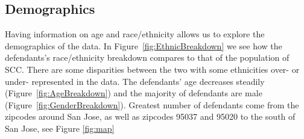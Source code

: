 \subsection{Demographics}
Having information on age and race/ethnicity allows us to explore the demographics of the data. In Figure~\ref{fig:EthnicBreakdown} we see how the defendants's race/ethnicity breakdown compares to that of the population of SCC. There are some disparities between the two with some ethnicities over- or under- represented in the data. The defendants' age decreases steadily (Figure~\ref{fig:AgeBreakdown}) and the majority of defendants are male (Figure~\ref{fig:GenderBreakdown}). Greatest number of defendants come from the zipcodes around San Jose, as well as zipcodes 95037 and 95020 to the south of San Jose, see Figure \ref{fig:map}